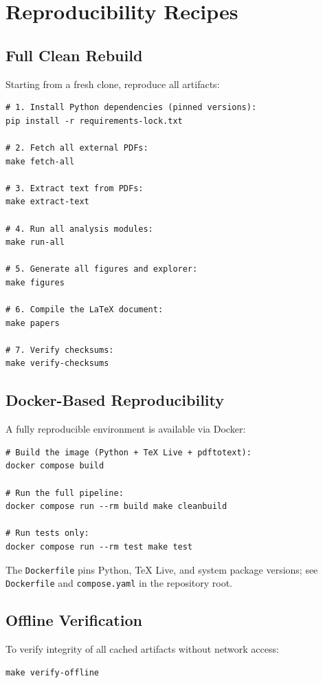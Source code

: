 \section{Reproducibility Recipes}
\label{app:repro_recipes}

\subsection{Full Clean Rebuild}

Starting from a fresh clone, reproduce all artifacts:

\begin{verbatim}
# 1. Install Python dependencies (pinned versions):
pip install -r requirements-lock.txt

# 2. Fetch all external PDFs:
make fetch-all

# 3. Extract text from PDFs:
make extract-text

# 4. Run all analysis modules:
make run-all

# 5. Generate all figures and explorer:
make figures

# 6. Compile the LaTeX document:
make papers

# 7. Verify checksums:
make verify-checksums
\end{verbatim}

\subsection{Docker-Based Reproducibility}

A fully reproducible environment is available via Docker:
\begin{verbatim}
# Build the image (Python + TeX Live + pdftotext):
docker compose build

# Run the full pipeline:
docker compose run --rm build make cleanbuild

# Run tests only:
docker compose run --rm test make test
\end{verbatim}

The \texttt{Dockerfile} pins Python, TeX Live, and system package versions;
see \texttt{Dockerfile} and \texttt{compose.yaml} in the repository root.

\subsection{Offline Verification}

To verify integrity of all cached artifacts without network access:
\begin{verbatim}
make verify-offline
\end{verbatim}

